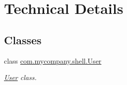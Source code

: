 \hypertarget{group__TechnicalDetails}{}\section{Technical Details}
\label{group__TechnicalDetails}
\subsection*{Classes}
\begin{DoxyCompactItemize}
\item 
class \hyperlink{classcom_1_1mycompany_1_1shell_1_1User}{com.\+mycompany.\+shell.\+User}
\begin{DoxyCompactList}\small\item\em \hyperlink{classcom_1_1mycompany_1_1shell_1_1User}{User} class. \end{DoxyCompactList}\end{DoxyCompactItemize}
